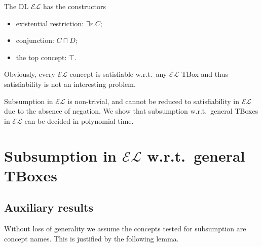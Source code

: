 The DL $\mathcal{EL}$ has the constructors
\begin{itemize}
	\item existential restriction: $\exists r.C$;
	\item conjunction: $C \sqcap D$;
	\item the top concept: $\top$.
\end{itemize}
Obviously, every $\mathcal{EL}$ concept is satisfiable w.r.t.\ any $\mathcal{EL}$ TBox
and thus satisfiability is not an interesting problem.

Subsumption in $\mathcal{EL}$ is non-trivial, and cannot be reduced to satisfiability in $\mathcal{EL}$ due to the absence of negation.
We show that subsumption w.r.t.\ general TBoxes in $\mathcal{EL}$ can be decided in polynomial time.

\section{Subsumption in $\mathcal{EL}$ w.r.t.\ general TBoxes}
\subsection{Auxiliary results}
Without loss of generality we assume the concepts tested for subsumption are concept names.
This is justified by the following lemma.

